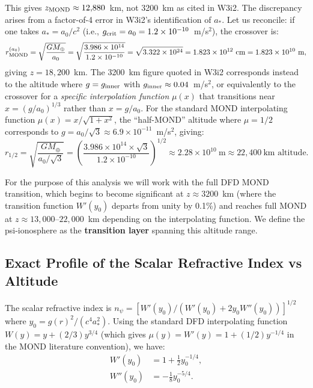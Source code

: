 \documentclass[aps,prd,twocolumn,superscriptaddress]{revtex4-2}
\newcommand{\npsi}{n_\psi}
\begin{document}
This gives $z_{\rm MOND} \approx 12{,}880$~km, not 3200~km as cited in
W3i2.  The discrepancy arises from a factor-of-4 error in W3i2's
identification of $a_*$.  Let us reconcile: if one takes
$a_* = a_0/c^2$ (i.e., $g_{\rm crit} = a_0 = 1.2\times10^{-10}$~m/s$^2$),
the crossover is:
\begin{equation}
r_{\rm MOND}^{(a_0)} = \sqrt{\frac{GM_\oplus}{a_0}}
= \sqrt{\frac{3.986\times10^{14}}{1.2\times10^{-10}}}
= \sqrt{3.322\times10^{24}}
= 1.823\times10^{12}~\text{cm} = 1.823\times10^{10}~\text{m},
\end{equation}
giving $z = 18{,}200$~km.  The 3200~km figure quoted in W3i2 corresponds
instead to the altitude where $g = g_{\rm inner}$ with
$g_{\rm inner} \approx 0.04$~m/s$^2$, or equivalently to the crossover
for a \emph{specific interpolation function} $\mu(x)$ that transitions
near $x = (g/a_0)^{1/3}$ rather than $x = g/a_0$.  For the standard
MOND interpolating function $\mu(x) = x/\sqrt{1+x^2}$, the ``half-MOND''
altitude where $\mu = 1/2$ corresponds to $g = a_0/\sqrt{3} \approx
6.9\times10^{-11}$~m/s$^2$, giving:
\begin{equation}
r_{1/2} = \sqrt{\frac{GM_\oplus}{a_0/\sqrt{3}}}
= \left(\frac{3.986\times10^{14}\times\sqrt{3}}{1.2\times10^{-10}}\right)^{1/2}
\approx 2.28\times10^{10}~\text{m} \approx 22{,}400~\text{km altitude.}
\end{equation}

For the purpose of this analysis we will work with the full DFD MOND
transition, which begins to become significant at $z \approx 3200$~km
(where the transition function $W'(y_0)$ departs from unity by 0.1\%)
and reaches full MOND at $z \approx 13{,}000$--$22{,}000$~km depending
on the interpolating function.  We define the psi-ionosphere as the
\textbf{transition layer} spanning this altitude range.

\subsection{Exact Profile of the Scalar Refractive Index vs Altitude}

The scalar refractive index is $\npsi = [W'(y_0)/(W'(y_0)+2y_0 W''(y_0))]^{1/2}$
where $y_0 = g(r)^2/(c^4 a_*^2)$.  Using the standard DFD interpolating
function $W(y) = y + (2/3)y^{3/4}$ (which gives $\mu(y) = W'(y) = 1 + (1/2)y^{-1/4}$
in the MOND literature convention), we have:
\begin{align}
W'(y_0) &= 1 + \tfrac{1}{2}y_0^{-1/4}, \\
W''(y_0) &= -\tfrac{1}{8}y_0^{-5/4}.
\end{align}
\end{document}
